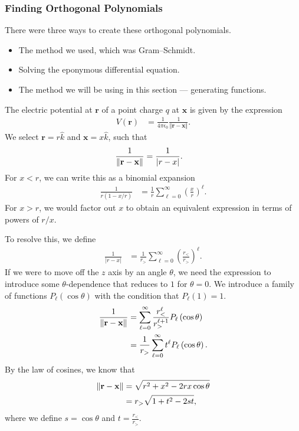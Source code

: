 \documentclass[10pt]{mypackage}
\begin{document}
\subsubsection{Finding Orthogonal Polynomials}%
There were three ways to create these orthogonal polynomials.
\begin{itemize}
  \item The method we used, which was Gram--Schmidt.
  \item Solving the eponymous differential equation.
  \item The method we will be using in this section --- generating functions.
\end{itemize}
\begin{example}
The electric potential at $\mathbf{r}$ of a point charge $q$ at $\mathbf{x}$ is given by the expression
\begin{align*}
  V\left(\mathbf{r}\right) &= \frac{1}{4\pi \epsilon_0} \frac{1}{\left\Vert \mathbf{r} - \mathbf{x} \right\Vert}.
\end{align*}
We select $\mathbf{r} = r\widehat{k}$ and $\mathbf{x} = x\widehat{k}$, such that
\begin{align*}
  \frac{1}{\norm{\mathbf{r} - \mathbf{x}}} &= \frac{1}{\left\vert r - x \right\vert}.
\end{align*}
For $x < r$, we can write this as a binomial expansion
\begin{align*}
  \frac{1}{r\left(1 - x/r\right)} &= \frac{1}{r} \sum_{\ell = 0}^{\infty}\left(\frac{x}{r}\right)^{\ell}.
\end{align*}
For $x > r$, we would factor out $x$ to obtain an equivalent expression in terms of powers of $r/x$.\newline

To resolve this, we define
\begin{align*}
  \frac{1}{\left\vert r-x \right\vert} &= \frac{1}{r_{>}} \sum_{\ell=0}^{\infty}\left(\frac{r_{<}}{r_{>}}\right)^{\ell}.
\end{align*}
If we were to move off the $z$ axis by an angle $\theta$, we need the expression to introduce some $\theta$-dependence that reduces to $1$ for $\theta = 0$. We introduce a family of functions $P_{\ell}\left(\cos\theta\right)$ with the condition that $P_{\ell}(1) = 1$.
\begin{align*}
  \frac{1}{\norm{\mathbf{r} - \mathbf{x}}} &= \sum_{\ell = 0}^{\infty}\frac{r_{ < }^{\ell}}{r^{\ell + 1}_{ > }}P_{\ell}\left(\cos\theta\right)\\
                                           &= \frac{1}{r_{ > }} \sum_{\ell = 0}^{\infty} t^{\ell}P_{\ell}\left(\cos\theta\right).
\end{align*}
By the law of cosines, we know that
\begin{align*}
  \norm{\mathbf{r} - \mathbf{x}} &= \sqrt{r^2 + x^2 - 2rx\cos\theta}\\
                                 &= r_{ > }\sqrt{1 + t^2 - 2st},
\end{align*}
where we define $s = \cos\theta$ and $t = \frac{r_{ < }}{r_{ > }}$.\newline


\end{example}
\end{document}
